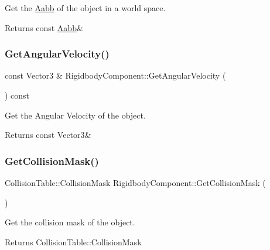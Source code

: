 Get the \hyperlink{classAabb}{Aabb} of the object in a world space. 

\begin{DoxyReturn}{Returns}
const \hyperlink{classAabb}{Aabb}\& 
\end{DoxyReturn}
\mbox{\label{classRigidbodyComponent_affcd899b87d83aa4147793481f17f5af}} 
\subsubsection{\texorpdfstring{Get\+Angular\+Velocity()}{GetAngularVelocity()}}
{\footnotesize\ttfamily const Vector3 \& Rigidbody\+Component\+::\+Get\+Angular\+Velocity (\begin{DoxyParamCaption}{ }\end{DoxyParamCaption}) const}



Get the Angular Velocity of the object. 

\begin{DoxyReturn}{Returns}
const Vector3\& 
\end{DoxyReturn}
\mbox{\label{classRigidbodyComponent_a6b7cc610ebeac138cddc580c746e3eb2}} 
\subsubsection{\texorpdfstring{Get\+Collision\+Mask()}{GetCollisionMask()}}
{\footnotesize\ttfamily Collision\+Table\+::\+Collision\+Mask Rigidbody\+Component\+::\+Get\+Collision\+Mask (\begin{DoxyParamCaption}{ }\end{DoxyParamCaption})}



Get the collision mask of the object. 

\begin{DoxyReturn}{Returns}
Collision\+Table\+::\+Collision\+Mask 
\end{DoxyReturn}
\mbox{\label{classRigidbodyComponent_acf62ca0b197641a3e536e38e5b90f0b1}} 
